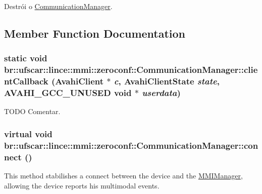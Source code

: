 Destrói o \hyperlink{classbr_1_1ufscar_1_1lince_1_1mmi_1_1zeroconf_1_1CommunicationManager}{CommunicationManager}. 



\subsection{Member Function Documentation}
\hypertarget{classbr_1_1ufscar_1_1lince_1_1mmi_1_1zeroconf_1_1CommunicationManager_ac7e195d0638ae6794150c9efb146259c}{
\subsubsection[{clientCallback}]{\setlength{\rightskip}{0pt plus 5cm}static void br::ufscar::lince::mmi::zeroconf::CommunicationManager::clientCallback (AvahiClient $\ast$ {\em c}, \/  AvahiClientState {\em state}, \/  AVAHI\_\-GCC\_\-UNUSED void $\ast$ {\em userdata})}}
\label{classbr_1_1ufscar_1_1lince_1_1mmi_1_1zeroconf_1_1CommunicationManager_ac7e195d0638ae6794150c9efb146259c}


TODO Comentar. 

\hypertarget{classbr_1_1ufscar_1_1lince_1_1mmi_1_1zeroconf_1_1CommunicationManager_a580a75f652a1b1e233b6075f740555e1}{
\subsubsection[{connect}]{\setlength{\rightskip}{0pt plus 5cm}virtual void br::ufscar::lince::mmi::zeroconf::CommunicationManager::connect ()}}
\label{classbr_1_1ufscar_1_1lince_1_1mmi_1_1zeroconf_1_1CommunicationManager_a580a75f652a1b1e233b6075f740555e1}


This method stabilishes a connect between the device and the \hyperlink{classbr_1_1ufscar_1_1lince_1_1mmi_1_1MMIManager}{MMIManager}, allowing the device reports his multimodal events. 



